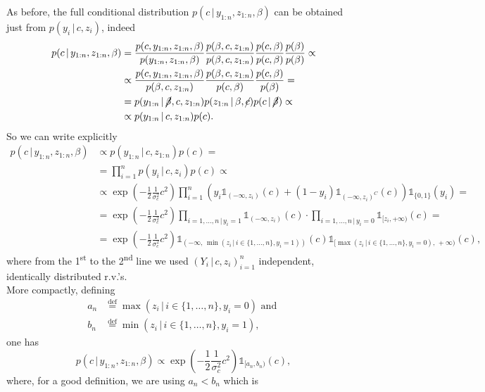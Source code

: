 \documentclass[
  11pt,
]{article}
\begin{document}
As before, the full conditional distribution
\(p(c \,|\,y_{1:n}, z_{1:n}, \beta)\) can be obtained just from
\(p(y_i \,|\,c, z_i)\), indeed \begin{align*}
        p(c \,|\,y_{1:n}, z_{1:n}, \beta) & = \frac{p(c, y_{1:n}, z_{1:n}, \beta)}{p(y_{1:n}, z_{1:n}, \beta)} \frac{p(\beta, c, z_{1:n})}{p(\beta, c, z_{1:n})} \frac{p(c, \beta)}{p(c, \beta)} \frac{p(\beta)}{p(\beta)} \propto \\
        & \propto \frac{p(c, y_{1:n}, z_{1:n}, \beta)}{p(\beta, c, z_{1:n})} \frac{p(\beta, c, z_{1:n})}{p(c, \beta)} \frac{p(c, \beta)}{p(\beta)} = \\
        & = p(y_{1:n} \,|\,\cancel{\beta}, c, z_{1:n}) p(z_{1:n} \,|\,\beta, \cancel{c}) p(c \,|\,\cancel{\beta}) \propto \\
        & \propto p(y_{1:n} \,|\,c, z_{1:n}) p(c).
    \end{align*} So we can write explicitly \begin{align*}
        p(c \,|\,y_{1:n}, z_{1:n}, \beta) & \propto p(y_{1:n} \,|\,c, z_{1:n}) p(c) = \\
        & = \prod_{i = 1}^n p(y_i \,|\,c, z_i) p(c) \propto \\
        & \propto \operatorname{exp}\left(-\frac{1}{2} \frac{1}{\sigma_c^2} c^2\right) \prod_{i = 1}^n \left(y_i \mathds{1}_{(-\infty, z_i)}(c) + (1 - y_i) \mathds{1}_{(-\infty, z_i)^C}(c)\right) \mathds{1}_{\{0, 1\}}(y_i) = \\
        & = \operatorname{exp}\left(-\frac{1}{2} \frac{1}{\sigma_c^2} c^2\right) \prod_{{i = 1, \dots, n \,|\,y_i = 1}} \mathds{1}_{(-\infty, z_i)}(c) \cdot \prod_{{i = 1, \dots, n \,|\,y_i = 0}} \mathds{1}_{[z_i, +\infty)}(c) = \\
        & = \operatorname{exp}\left(-\frac{1}{2} \frac{1}{\sigma_c^2} c^2\right) \mathds{1}_{(-\infty, \, \min\left(z_i \,|\,i \in \{1, \dots, n\}, y_i = 1\right))}(c) \mathds{1}_{[\max\left(z_i \,|\,i \in \{1, \dots, n\}, y_i = 0\right), \, +\infty)}(c),
    \end{align*} where from the 1\textsuperscript{st} to the
2\textsuperscript{nd} line we used
\(\left(Y_i \,|\,c, z_i\right)_{i = 1}^n\) independent, identically
distributed r.v.'s.\\
More compactly, defining \begin{align*}
        a_n & \stackrel{\text{def}}{=}\max\left(z_i \,|\,i \in \{1, \dots, n\}, y_i = 0\right) \text{ and } \\
        b_n & \stackrel{\text{def}}{=}\min\left(z_i \,|\,i \in \{1, \dots, n\}, y_i = 1\right),
    \end{align*} one has \[
        p(c \,|\,y_{1:n}, z_{1:n}, \beta) \propto \operatorname{exp}\left(-\frac{1}{2} \frac{1}{\sigma_c^2} c^2\right) \mathds{1}_{[a_n, b_n)}(c),
    \] where, for a good definition, we are using \(a_n < b_n\) which is
\end{document}
